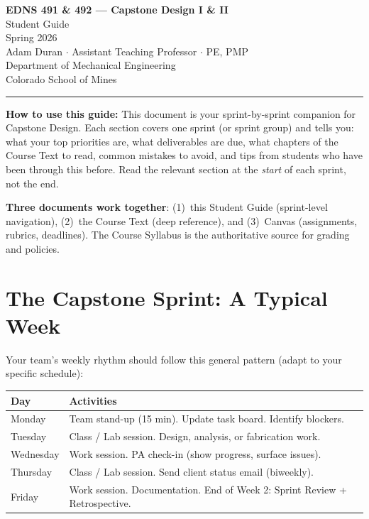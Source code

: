 \documentclass[11pt,letterpaper]{article}
\begin{document}
\begin{center}
{\LARGE\bfseries\textcolor{minesblue}{EDNS 491 \& 492 --- Capstone Design I \& II}}\\[6pt]
{\Large\textcolor{minesblue}{Student Guide}}\\[4pt]
{\large Spring 2026}\\[6pt]
{\normalsize Adam Duran $\cdot$ Assistant Teaching Professor $\cdot$ PE, PMP}\\
{\normalsize Department of Mechanical Engineering}\\
{\normalsize Colorado School of Mines}\\[8pt]
\textcolor{minesgold}{\rule{0.7\textwidth}{1.5pt}}
\end{center}

\vspace{12pt}

\textbf{How to use this guide:} This document is your sprint-by-sprint companion for Capstone Design. Each section covers one sprint (or sprint group) and tells you: what your top priorities are, what deliverables are due, what chapters of the Course Text to read, common mistakes to avoid, and tips from students who have been through this before. Read the relevant section at the \emph{start} of each sprint, not the end.

\textbf{Three documents work together}: (1)~this Student Guide (sprint-level navigation), (2)~the Course Text (deep reference), and (3)~Canvas (assignments, rubrics, deadlines). The Course Syllabus is the authoritative source for grading and policies.

\tableofcontents
\newpage


\section{The Capstone Sprint: A Typical Week}

Your team's weekly rhythm should follow this general pattern (adapt to your specific schedule):

\begin{center}\small
\begin{tabularx}{\textwidth}{lX}
\toprule
\textbf{Day} & \textbf{Activities} \\
\midrule
Monday & Team stand-up (15 min). Update task board. Identify blockers. \\
Tuesday & Class / Lab session. Design, analysis, or fabrication work. \\
Wednesday & Work session. PA check-in (show progress, surface issues). \\
Thursday & Class / Lab session. Send client status email (biweekly). \\
Friday & Work session. Documentation. End of Week 2: Sprint Review + Retrospective. \\
\bottomrule
\end{tabularx}
\end{center}
\end{document}
